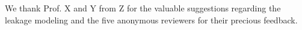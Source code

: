 We thank Prof. X and Y from Z for the valuable suggestions regarding the leakage modeling and the five anonymous reviewers for their precious feedback.
